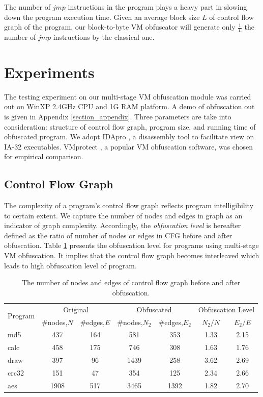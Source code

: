 \documentclass{../style/llncs}                   %
\begin{document}
The number of $jmp$ instructions in the program plays a heavy part in
slowing down the program execution time. Given an average block size $L$ of
control flow graph of the program, our block-to-byte VM obfuscator will generate
only $\frac{1}{L}$ the number of $jmp$ instructions by the classical one.




\section{Experiments} \label{section_expr}

The testing experiment on our multi-stage VM obfuscation module
was carried out on WinXP 2.4GHz CPU and 1G RAM platform.
A demo of obfuscation out is given in Appendix \ref{section_appendix}.
Three parameters are take into consideration: structure of control
flow graph, program size, and running time of obfuscated program.
We adopt IDApro \cite{idadebugger}, a disassembly tool
to facilitate view on IA-32 executables. VMprotect \cite{vmprotect},
a popular VM obfuscation software, was chosen for empirical comparison.


\subsection{Control Flow Graph}

The complexity of a program's control flow graph reflects
program intelligibility to certain extent. We capture
the number of nodes and edges in graph as an indicator
of graph complexity. Accordingly, the \emph{obfuscation level}
is hereafter defined as the ratio of number of nodes
or edges in CFG before and after obfuscation.
Table \ref{tab_obf_control_flow_graph} presents the obfuscation
level for programs using multi-stage VM obfuscation.
It implies that the control flow graph becomes interleaved which
leads to high obfuscation level of program.


\begin{table}  \centering
\caption{The number of nodes and edges of control flow graph before and after obfuscation. } \label{tab_obf_control_flow_graph}
\small %
\begin{tabular}{ |l|c|c|c|c|c|c| }
\hline
\multirow{2}{*}{Program} & \multicolumn{2}{|c|}{Original} & \multicolumn{2}{|c|}{Obfuscated}  & \multicolumn{2}{|c|}{Obfuscation Level}    \\
\cline{2-7} & \#nodes,$N$ & \#edges,$E$ & \#nodes,$N_2$ & \#edges,$E_2$ & $N_2/N$ & $E_2/E$ \\
\hline \hline
 md5     &  437 & 164  &  581    &  353  & 1.33  & 2.15 \\
 calc    &  458 & 175  &  746    &  308  & 1.63  & 1.76 \\
 draw    &  397 & 96   &  1439   &  258  & 3.62  & 2.69 \\
 crc32   &  151 & 47   &  354    &  125  & 2.34  & 2.66 \\
 aes     &  1908& 517  &  3465   &  1392 & 1.82  & 2.70 \\
\hline
\end{tabular}
\end{table}
\end{document}

